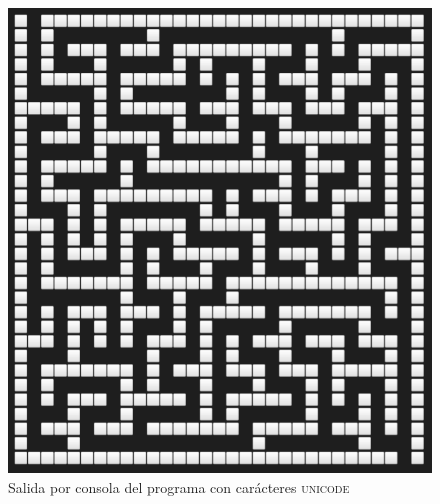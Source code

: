 \documentclass[12pt,a4paper]{article}
\begin{document}
\begin{figure}[h]
	\centering
	\includegraphics[scale=0.4]{fotos/unicode.png}
	\caption{Salida por consola del programa con carácteres \textsc{unicode}}
	\label{unicode}
\end{figure}
\end{document}
